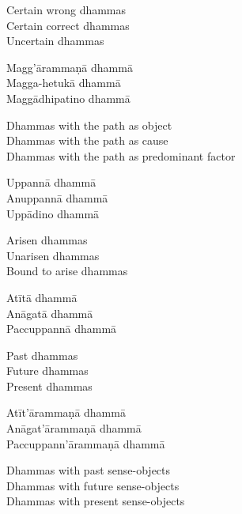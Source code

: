 \begin{english-verses}
  Certain wrong dhammas\\
  Certain correct dhammas\\
  Uncertain dhammas
\end{english-verses}

\begin{pali-hang-continued}
Magg'ārammaṇā dhammā\\
Magga-hetukā dhammā\\
Maggādhipatino dhammā
\end{pali-hang-continued}

\begin{english-verses}
  Dhammas with the path as object\\
  Dhammas with the path as cause\\
  Dhammas with the path as predominant factor
\end{english-verses}

\begin{pali-hang-continued}
Uppannā dhammā\\
Anuppannā dhammā\\
Uppādino dhammā
\end{pali-hang-continued}

\begin{english-verses}
  Arisen dhammas\\
  Unarisen dhammas\\
  Bound to arise dhammas
\end{english-verses}

\begin{pali-hang-continued}
Atītā dhammā\\
Anāgatā dhammā\\
Paccuppannā dhammā
\end{pali-hang-continued}

\begin{english-verses}
  Past dhammas\\
  Future dhammas\\
  Present dhammas
\end{english-verses}

\begin{pali-hang-continued}
Atīt'ārammaṇā dhammā\\
Anāgat'ārammaṇā dhammā\\
Paccuppann'ārammaṇā dhammā
\end{pali-hang-continued}

\begin{english-verses}
  Dhammas with past sense-objects\\
  Dhammas with future sense-objects\\
  Dhammas with present sense-objects
\end{english-verses}


